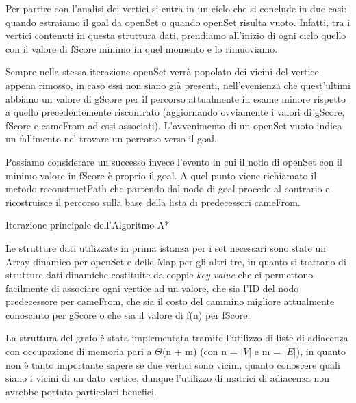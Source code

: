 \documentclass[12pt,a4paper]{report}
\begin{document}
Per partire con l'analisi dei vertici si entra in un ciclo che si conclude in due casi: quando estraiamo il goal da openSet o quando openSet risulta vuoto. Infatti, tra i vertici contenuti in questa struttura dati, prendiamo all'inizio di ogni ciclo quello con il valore di fScore minimo in quel momento e lo rimuoviamo.

Sempre nella stessa iterazione openSet verrà popolato dei vicini del vertice appena rimosso, in caso essi non siano già presenti, nell'evenienza che quest'ultimi abbiano un valore di gScore per il percorso attualmente in esame minore rispetto a quello precedentemente riscontrato (aggiornando ovviamente i valori di gScore, fScore e cameFrom ad essi associati).
L'avvenimento di un openSet vuoto indica un fallimento nel trovare un percorso verso il goal.

Possiamo considerare un successo invece l'evento in cui il nodo di openSet con il minimo valore in fScore è proprio il goal. A quel punto viene richiamato il metodo reconstructPath che partendo dal nodo di goal procede al contrario e ricostruisce il percorso sulla base della lista di predecessori cameFrom. 

\begin{algorithm}[H]
	\SetAlgoLined
	\caption{Iterazione principale dell'Algoritmo A*}
\end{algorithm}
\bigskip
Le strutture dati utilizzate in prima istanza per i set necessari sono state un Array dinamico per openSet e delle Map per gli altri tre, in quanto si trattano di strutture dati dinamiche costituite da coppie \emph{key-value} che ci permettono facilmente di associare ogni vertice ad un valore, che sia l'ID del nodo predecessore per cameFrom, che sia il costo del cammino migliore attualmente conosciuto per gScore o che sia il valore di f(n) per fScore.


La struttura del grafo è stata implementata tramite l'utilizzo di liste di adiacenza con occupazione di memoria pari a \(\Theta\)(n + m) (con n = \(|V|\) e m = \(|E|\)), in quanto non è tanto importante sapere se due vertici sono vicini, quanto conoscere quali siano i vicini di un dato vertice, dunque l'utilizzo di matrici di adiacenza non avrebbe portato particolari  benefici.
\end{document}
